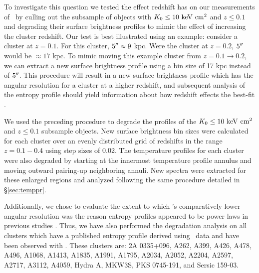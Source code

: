\documentclass[12pt,preprint]{aastex}
\begin{document}
To investigate this question we tested the effect redshift has on our
measurements of \kna\ by culling out the subsample of objects with
$K_0 \leq 10 \mathrm{\mbox{\ensuremath{\mathrm{~keV}}} \mathrm{\mbox{\ensuremath{\mathrm{~cm}}}^2}}$ and $z \leq 0.1$ and degrading their surface
brightness profiles to mimic the effect of increasing the cluster
redshift. Our test is best illustrated using an example: consider a
cluster at $z = 0.1$. For this cluster, $5\mathrm{^\prime}\hskip -0.1em\mathrm{^\prime} \approx 9$ kpc. Were
the cluster at $z = 0.2$, $5\mathrm{^\prime}\hskip -0.1em\mathrm{^\prime}$ would be $\approx 17$ kpc. To mimic
moving this example cluster from $z = 0.1 \rightarrow 0.2$, we can
extract a new surface brightness profile using a bin size of 17 kpc
instead of $5\mathrm{^\prime}\hskip -0.1em\mathrm{^\prime}$. This procedure will result in a new surface
brightness profile which has the angular resolution for a cluster at a
higher redshift, and subsequent analysis of the entropy profile should
yield information about how redshift effects the best-fit \kna.

We used the preceding procedure to degrade the profiles of the $K_0
\leq 10 \mathrm{\mbox{\ensuremath{\mathrm{~keV}}} \mathrm{\mbox{\ensuremath{\mathrm{~cm}}}^2}}$ and $z \leq 0.1$ subsample objects. New surface
brightness bin sizes were calculated for each cluster over an evenly
distributed grid of redshifts in the range $z = 0.1-0.4$ using step
sizes of 0.02. The temperature profiles for each cluster were also
degraded by starting at the innermost temperature profile annulus and
moving outward pairing-up neighboring annuli. New spectra were
extracted for these enlarged regions and analyzed following the same
procedure detailed in \S\ref{sec:temppr}.

Additionally, we chose to evaluate the extent to which \xmm's
comparatively lower angular resolution was the reason entropy profiles
appeared to be power laws in previous studies \citep[see][for
  examples]{piffaretti05, pratt06}. Thus, we have also performed the
degradation analysis on all clusters which have a published entropy
profile derived using \xmm\ data and have been observed with
\chandra. These clusters are: 2A 0335+096, A262, A399, A426, A478,
A496, A1068, A1413, A1835, A1991, A1795, A2034, A2052, A2204, A2597,
A2717, A3112, A4059, Hydra A, MKW3S, PKS 0745-191, and Sersic 159-03.
\end{document}
